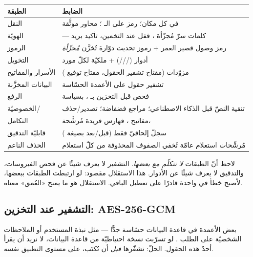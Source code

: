 \begin{center}
\begin{tabular}{L{3.4cm} L{9.4cm}}
\toprule
\textbf{\color{spPrimary}الطبقة} & \textbf{\color{spPrimary}الضابط} \\
\midrule
النقل  &  في كل مكان؛ رمز  على الـ ؛ محاور  موثَّقة \\
الهويّة  &  — كلمات سرّ مُجزّأة ، قفل عند التخمين، تأكيد بريد \\
الرموز  & رمز وصول  قصير العمر + رموز تحديث  دوّارة تُخزَّن \emph{مُجزّأة} \\
التخويل  & أدوار (///) + ملكيّة لكلّ مورد \\
الأسرار والمفاتيح & مزوّدات  (مفتاح تشفير الحقول، مفتاح توقيع ) \\
البيانات المخزَّنة & تشفير حقول  على الأعمدة الحسّاسة \\
الرفع  & فحص-قبل-التخزين بـ ، بسياسة  \\
الخصوصيّة/ & تنقية النصّ قبل الذكاء الاصطناعي؛ مراجع فضفاضة؛ تصدير/حذف  \\
التكامل  & مفاتيح ، فهارس فريدة مُرشَّحة،  \\
قابليّة التدقيق & سجلّ  إلحاقيّ فقط (قبل/بعد بصيغة ) \\
الحذف الناعم & مُرشِّحات استعلام عامّة تُخفي الصفوف المحذوفة من كلّ استعلام \\
\bottomrule
\end{tabular}
\end{center}

\begin{why}
لاحظ أنّ الطبقات \emph{لا تتكلّم مع بعضها}. التشفير لا يعرف شيئًا عن فحص الفيروسات،
والتدقيق لا يعرف شيئًا عن الأدوار. هذا الاستقلال مقصود: لو ارتبطت الطبقات ببعضها،
لأصبح خطأ في واحدة قادرًا على تعطيل الباقي. الاستقلال هو ما يمنح «العُمق» معناه.
\end{why}

\subsection{التشفير عند التخزين: AES-256-GCM}

بعض الأعمدة في قاعدة البيانات حسّاسة جدًّا — مثل نبذة المستخدم  أو
الملاحظات الشخصيّة على الطلب . لو تسرّبت نسخة احتياطيّة من قاعدة
البيانات، لا نريد أن يقرأ أحدٌ هذه الحقول. الحلّ: نشفّرها \emph{قبل} أن تُكتَب، على
مستوى التطبيق نفسه.

